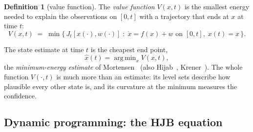 \documentclass[11pt,a4paper]{article}
\newcommand{\argmin}{\operatorname{arg\,min}}
\newcommand{\xh}{\hat{x}}
\theoremstyle{plain}
\theoremstyle{definition}
\newtheorem{definition}{Definition}
\theoremstyle{remark}
\begin{document}
\begin{definition}[value function]
The \emph{value function} $V(x,t)$ is the smallest energy needed to explain the observations on $[0,t]$ with a trajectory that ends at $x$ at time $t$:
\begin{equation}
  V(x,t) \;=\; \min\Big\{\, J_t[x(\cdot),w(\cdot)] \;:\; \dot x = f(x)+w \text{ on }[0,t],\; x(t)=x \,\Big\}.
  \label{eq:value}
\end{equation}
\end{definition}
The state estimate at time $t$ is the cheapest end point,
\begin{equation}
  \xh(t) = \argmin_x V(x,t),
  \label{eq:estimate}
\end{equation}
the \emph{minimum-energy estimate} of Mortensen~\cite{Mortensen1968} (also Hijab~\cite{Hijab1980}, Krener~\cite{Krener2003}). The whole function $V(\cdot,t)$ is much more than an estimate: its level sets describe how plausible every other state is, and its curvature at the minimum measures the confidence.

\subsection{Dynamic programming: the HJB equation}
\end{document}

